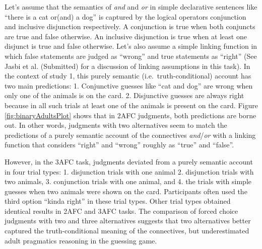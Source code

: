 \documentclass[oneside]{report}
\theoremstyle{definition}
\theoremstyle{definition}
\theoremstyle{definition}
\theoremstyle{remark}
\begin{document}
Let's assume that the semantics of \emph{and} and \emph{or} in simple
declarative sentences like ``there is a cat or(and) a dog'' is captured
by the logical operators conjunction and inclusive disjunction
respectively. A conjunction is true when both conjuncts are true and
false otherwise. An inclusive disjunction is true when at least one
disjunct is true and false otherwise. Let's also assume a simple linking
function in which false statements are judged as ``wrong'' and true
statements as ``right'' (See Jasbi et al. (Submitted) for a discussion
of linking assumptions in this task). In the context of study 1, this
purely semantic (i.e.~truth-conditional) account has two main
predictions: 1. Conjunctive guesses like ``cat and dog'' are wrong when
only one of the animals is on the card. 2. Disjunctive guesses are
always right because in all such trials at least one of the animals is
present on the card. Figure \ref{fig:binaryAdultsPlot} shows that in
2AFC judgments, both predictions are borne out. In other words,
judgments with two alternatives seem to match the predictions of a
purely semantic account of the connectives \emph{and}/\emph{or} with a
linking function that considers ``right'' and ``wrong'' roughly as
``true'' and ``false''.

However, in the 3AFC task, judgments deviated from a purely semantic
account in four trial types: 1. disjunction trials with one animal 2.
disjunction trials with two animals, 3. conjunction trials with one
animal, and 4. the trials with simple guesses when two animals were
shown on the card. Participants often used the third option ``kinda
right'' in these trial types. Other trial types obtained identical
results in 2AFC and 3AFC tasks. The comparison of forced choice
judgments with two and three alternatives suggests that two alternatives
better captured the truth-conditional meaning of the connectives, but
underestimated adult pragmatics reasoning in the guessing game.
\end{document}

